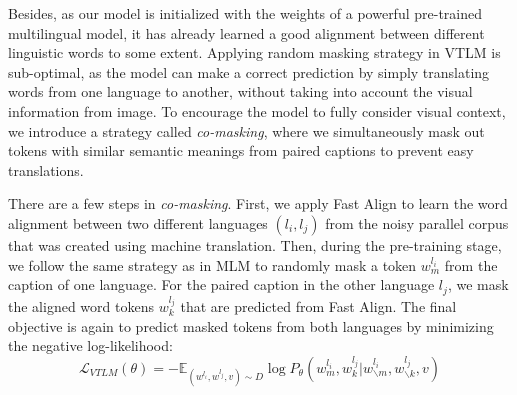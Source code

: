 \documentclass[final]{cvpr}
\newcommand{\jj}[1]{\textcolor{red}{\small{\bf [JJ: #1 ]}}}
\newcommand{\mingyang}[1]{\textcolor{brown}{\small{\bf [Mingyang: #1 ]}}}
\begin{document}
Besides, as our model is initialized with the weights of a powerful pre-trained multilingual model, it has already learned a good alignment between different linguistic words to some extent. Applying random masking strategy in VTLM is sub-optimal, as  
the model can make a correct prediction by simply translating words from one language to another, without taking into account the visual information from image. 
To encourage the model to fully consider visual context, we introduce a strategy called \emph{co-masking}, where we simultaneously mask out tokens with similar semantic meanings from paired captions to prevent easy translations. 


There are a few steps in \emph{co-masking}. First, we apply Fast Align \cite{fast_align} to learn the word alignment between two different languages $(l_i, l_j)$ from the noisy parallel corpus that was created using machine translation. Then, during the pre-training stage, we follow the same strategy as in MLM to randomly mask a token $w^{l_i}_{m}$ from the caption of one language. For the paired caption in the other language $l_j$, we mask the aligned word tokens $w^{l_j}_{k}$ that are predicted from Fast Align. \cite{fast_align} 
The final objective is again to predict masked tokens from both languages by minimizing the negative log-likelihood:
\begin{equation*}
    \mathcal{L}_{VTLM}(\theta) = - \mathbb{E}_{(w^{l_i}, w^{l_j}, v)\sim D} \log{P_{\theta}(w^{l_i}_m, w^{l_j}_k|w^{l_i}_{\backslash m}, w^{l_j}_{\backslash k}, v)}
\end{equation*}
\end{document}
